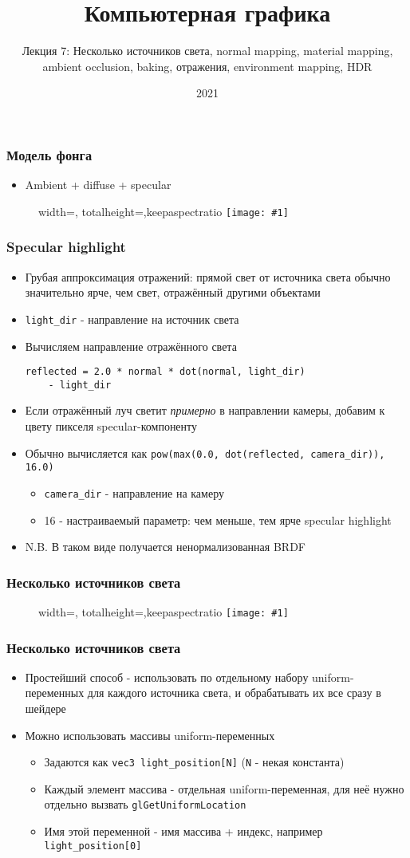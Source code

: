 \documentclass{beamer}
\title{Компьютерная графика}
\subtitle{Лекция 7: Несколько источников света, normal mapping, material mapping, ambient occlusion, baking, отражения, environment mapping, HDR}
\date{2021}
\newcommand{\slideimage}[1]{
  \begin{figure}
    \begin{adjustbox}{width=\textwidth, totalheight=\textheight-2\baselineskip-2\baselineskip,keepaspectratio}
      \texttt{[image: \#1]}
    \end{adjustbox}
  \end{figure}
}
\begin{document}
\frame{\titlepage}

\begin{frame}[fragile]
\frametitle{Модель фонга}
\begin{itemize}
\item Ambient + diffuse + specular
\end{itemize}
\slideimage{phong.png}
\end{frame}

\begin{frame}[fragile]
\frametitle{Specular highlight}
\begin{itemize}
\item Грубая аппроксимация отражений: прямой свет от источника света обычно значительно ярче, чем свет, отражённый другими объектами
\pause
\item \verb|light_dir| - направление на источник света
\item Вычисляем направление отражённого света
\begin{verbatim}
reflected = 2.0 * normal * dot(normal, light_dir)
    - light_dir
\end{verbatim}
\pause
\item Если отражённый луч светит \textit{примерно} в направлении камеры, добавим к цвету пикселя specular-компоненту
\pause
\item Обычно вычисляется как \verb|pow(max(0.0, dot(reflected, camera_dir)), 16.0)|
\begin{itemize}
\item \verb|camera_dir| - направление на камеру
\item 16 - настраиваемый параметр: чем меньше, тем ярче specular highlight
\end{itemize}
\pause
\item N.B. В таком виде получается ненормализованная BRDF
\end{itemize}
\end{frame}

\begin{frame}[fragile]
\frametitle{Несколько источников света}
\slideimage{many-lights.png}
\end{frame}

\begin{frame}[fragile]
\frametitle{Несколько источников света}
\begin{itemize}
\item Простейший способ - использовать по отдельному набору uniform-переменных для каждого источника света, и обрабатывать их все сразу в шейдере
\pause
\item Можно использовать массивы uniform-переменных
\pause
\begin{itemize}
\item Задаются как \verb|vec3 light_position[N]| (\verb|N| - некая константа)
\item Каждый элемент массива - отдельная uniform-переменная, для неё нужно отдельно вызвать \verb|glGetUniformLocation|
\item Имя этой переменной - имя массива + индекс, например \verb|light_position[0]|
\end{itemize}
\end{itemize}
\end{frame}
\end{document}
